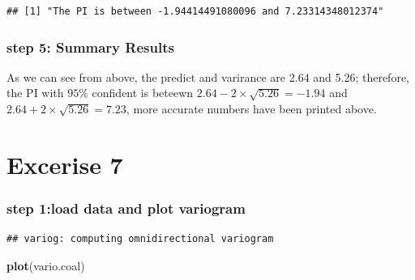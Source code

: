 \documentclass[]{article}
\newenvironment{Shaded}{\begin{snugshade}}{\end{snugshade}}
\newcommand{\KeywordTok}[1]{\textcolor[rgb]{0.13,0.29,0.53}{\textbf{#1}}}
\newcommand{\DataTypeTok}[1]{\textcolor[rgb]{0.13,0.29,0.53}{#1}}
\newcommand{\DecValTok}[1]{\textcolor[rgb]{0.00,0.00,0.81}{#1}}
\newcommand{\StringTok}[1]{\textcolor[rgb]{0.31,0.60,0.02}{#1}}
\newcommand{\OperatorTok}[1]{\textcolor[rgb]{0.81,0.36,0.00}{\textbf{#1}}}
\newcommand{\NormalTok}[1]{#1}
\begin{document}
\begin{verbatim}
## [1] "The PI is between -1.94414491080096 and 7.23314348012374"
\end{verbatim}

\subsubsection{step 5: Summary Results}\label{step-5-summary-results}

As we can see from above, the predict and varirance are 2.64 and 5.26;
therefore, the PI with \(95\%\) confident is beteewn
\(2.64-2\times\sqrt{5.26}= -1.94\) and \(2.64+2\times\sqrt{5.26}=7.23\),
more accurate numbers have been printed above.

\section{Excerise 7}\label{excerise-7}

\subsubsection{step 1:load data and plot
variogram}\label{step-1load-data-and-plot-variogram-1}

\begin{Shaded}
\end{Shaded}

\begin{verbatim}
## variog: computing omnidirectional variogram
\end{verbatim}

\begin{Shaded}
\begin{Highlighting}[]
\KeywordTok{plot}\NormalTok{(vario.coal)}
\end{Highlighting}
\end{Shaded}
\end{document}
